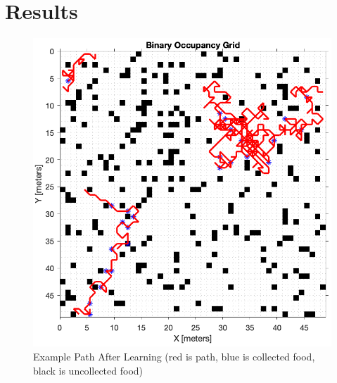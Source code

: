 \documentclass[11pt, twocolumn]{article}
\begin{document}
\section*{Results}
\begin{figure}[H]
	\centering
	\includegraphics[width=\linewidth]{learned_path}
	\caption{Example Path After Learning (red is path, blue is collected food, black is uncollected food)}
	\label{fig:learned_path}
\end{figure}
\end{document}
